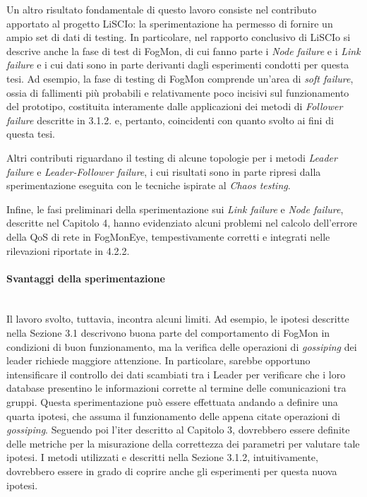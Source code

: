         Un altro risultato fondamentale di questo lavoro consiste nel contributo apportato al progetto LiSCIo: la sperimentazione ha permesso di fornire un ampio set di dati di testing. In particolare, nel rapporto conclusivo di LiSCIo \cite{FogMon} si descrive anche la fase di test di FogMon, di cui fanno parte i \textit{Node failure} e i \textit{Link failure} e i cui dati sono in parte derivanti dagli esperimenti condotti per questa tesi. Ad esempio, la fase di testing di FogMon comprende un'area di \textit{soft failure}, ossia di fallimenti più probabili e relativamente poco incisivi sul funzionamento del prototipo, costituita interamente dalle applicazioni dei metodi di \textit{Follower failure} descritte in 3.1.2. e, pertanto, coincidenti con quanto svolto ai fini di questa tesi. 
        
        Altri contributi riguardano il testing di alcune topologie per i metodi \textit{Leader failure} e \textit{Leader-Follower failure}, i cui risultati sono in parte ripresi dalla sperimentazione eseguita con le tecniche ispirate al \textit{Chaos testing}. 
        
        Infine, le fasi preliminari della sperimentazione sui \textit{Link failure} e \textit{Node failure}, descritte nel Capitolo 4, hanno evidenziato alcuni problemi nel calcolo dell'errore della QoS di rete in FogMonEye, tempestivamente corretti e integrati nelle rilevazioni riportate in 4.2.2.
        
        
        \paragraph{Svantaggi della sperimentazione}\mbox{}\\
        
        Il lavoro svolto, tuttavia, incontra alcuni limiti. Ad esempio, le ipotesi descritte nella Sezione 3.1 descrivono buona parte del comportamento di FogMon in condizioni di buon funzionamento, ma la verifica delle operazioni di \textit{gossiping} dei leader richiede maggiore attenzione. 
        In particolare, sarebbe opportuno intensificare il controllo dei dati scambiati tra i Leader per verificare che i loro database presentino le informazioni corrette al termine delle comunicazioni tra gruppi. Questa sperimentazione può essere effettuata andando a definire una quarta ipotesi, che assuma il funzionamento delle appena citate operazioni di \textit{gossiping}. Seguendo poi l'iter descritto al Capitolo 3, dovrebbero essere definite delle metriche per la misurazione della correttezza dei parametri per valutare tale ipotesi. I metodi utilizzati e descritti nella Sezione 3.1.2, intuitivamente, dovrebbero essere in grado di coprire anche gli esperimenti per questa nuova ipotesi.
            
